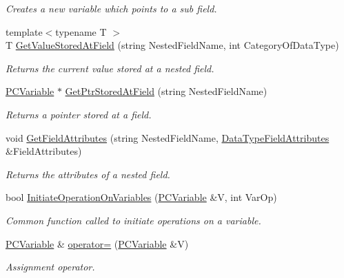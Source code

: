 \begin{DoxyCompactItemize}
\begin{DoxyCompactList}\small\item\em Creates a new variable which points to a sub field. \end{DoxyCompactList}\item 
{\footnotesize template$<$typename T $>$ }\\T \hyperlink{classpc__emulator_1_1PCVariable_a99116de2864a2e6fb87c7b06a9fdc012}{Get\+Value\+Stored\+At\+Field} (string Nested\+Field\+Name, int Category\+Of\+Data\+Type)
\begin{DoxyCompactList}\small\item\em Returns the current value stored at a nested field. \end{DoxyCompactList}\item 
\hyperlink{classpc__emulator_1_1PCVariable}{P\+C\+Variable} $\ast$ \hyperlink{classpc__emulator_1_1PCVariable_a6a12e58a20631cd21cf4b15e8eae3eb1}{Get\+Ptr\+Stored\+At\+Field} (string Nested\+Field\+Name)
\begin{DoxyCompactList}\small\item\em Returns a pointer stored at a field. \end{DoxyCompactList}\item 
void \hyperlink{classpc__emulator_1_1PCVariable_a82c58fe4c623c829df2d03e511727987}{Get\+Field\+Attributes} (string Nested\+Field\+Name, \hyperlink{structpc__emulator_1_1DataTypeFieldAttributesStruct}{Data\+Type\+Field\+Attributes} \&Field\+Attributes)
\begin{DoxyCompactList}\small\item\em Returns the attributes of a nested field. \end{DoxyCompactList}\item 
bool \hyperlink{classpc__emulator_1_1PCVariable_a8161b970c4f4950476d072362b26c601}{Initiate\+Operation\+On\+Variables} (\hyperlink{classpc__emulator_1_1PCVariable}{P\+C\+Variable} \&V, int Var\+Op)
\begin{DoxyCompactList}\small\item\em Common function called to initiate operations on a variable. \end{DoxyCompactList}\item 
\hyperlink{classpc__emulator_1_1PCVariable}{P\+C\+Variable} \& \hyperlink{classpc__emulator_1_1PCVariable_a6d42b2803aab78e7f36f7991d9cf5a5f}{operator=} (\hyperlink{classpc__emulator_1_1PCVariable}{P\+C\+Variable} \&V)
\begin{DoxyCompactList}\small\item\em Assignment operator. \end{DoxyCompactList}\item 

\end{DoxyCompactItemize}
